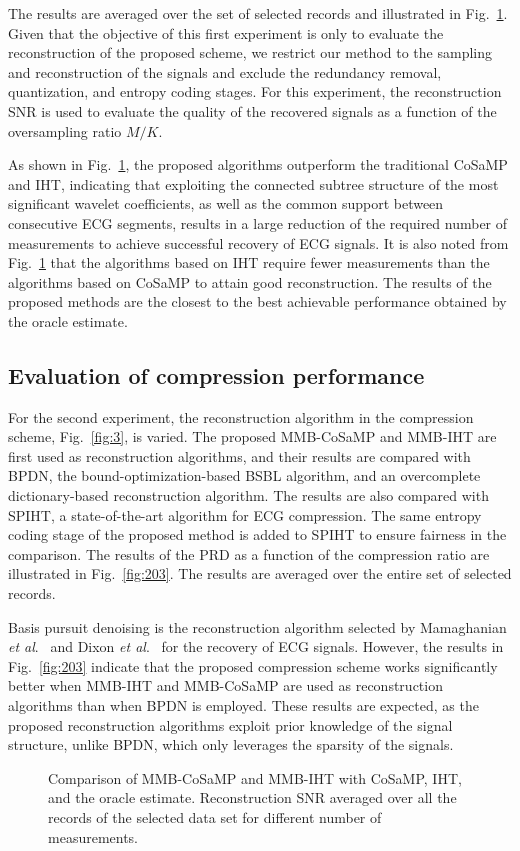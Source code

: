 \documentclass[journal]{IEEEtran}
\begin{document}
The results are averaged over the set of selected records and illustrated in Fig.~\ref{fig:202}. Given that the objective of this first experiment is only to evaluate the reconstruction of the proposed scheme, we restrict our method to the sampling and reconstruction of the signals and exclude the redundancy removal, quantization, and entropy coding stages. For this experiment, the reconstruction SNR is used to evaluate the quality of the recovered signals as a function of the oversampling ratio $M/K$.

As shown in Fig.~\ref{fig:202}, the proposed algorithms outperform the traditional CoSaMP and IHT, indicating that exploiting the connected subtree structure of the most significant wavelet coefficients, as well as the common support between consecutive ECG segments, results in a large reduction of the required number of measurements to achieve successful recovery of ECG signals. It is also noted from Fig.~\ref{fig:202} that the algorithms based on IHT require fewer measurements than the algorithms based on CoSaMP to attain good reconstruction. The results of the proposed methods are the closest to the best achievable performance obtained by the oracle estimate.

\subsection{Evaluation of compression performance}
For the second experiment, the reconstruction algorithm in the compression scheme, Fig.~\ref{fig:3}, is varied. The proposed MMB-CoSaMP and  MMB-IHT are first used as reconstruction algorithms, and their results are compared with BPDN, the bound-optimization-based BSBL algorithm, and an overcomplete dictionary-based reconstruction algorithm. The results are also compared with SPIHT, a state-of-the-art algorithm for ECG compression. The same entropy coding stage of the proposed method is added to SPIHT to ensure fairness in the comparison. The results of the PRD as a function of the compression ratio are illustrated in Fig.~\ref{fig:203}. The results are averaged over the entire set of selected records.

Basis pursuit denoising is the reconstruction algorithm selected by Mamaghanian \textit{et al}.~\cite{Mama11} and Dixon \textit{et al}.~\cite{Dixo12} for the recovery of ECG signals. However, the results in Fig.~\ref{fig:203} indicate that the proposed compression scheme works significantly better when MMB-IHT and MMB-CoSaMP are used as reconstruction algorithms than when BPDN is employed. These results are expected, as the proposed reconstruction algorithms exploit prior knowledge of the signal structure, unlike BPDN, which only leverages the sparsity of the signals.
\begin{figure}[t]
\caption{Comparison of MMB-CoSaMP and MMB-IHT with CoSaMP, IHT, and the oracle estimate. Reconstruction SNR averaged over all the records of the selected data set for different number of measurements.} \label{fig:202}
\end{figure}
\end{document}
